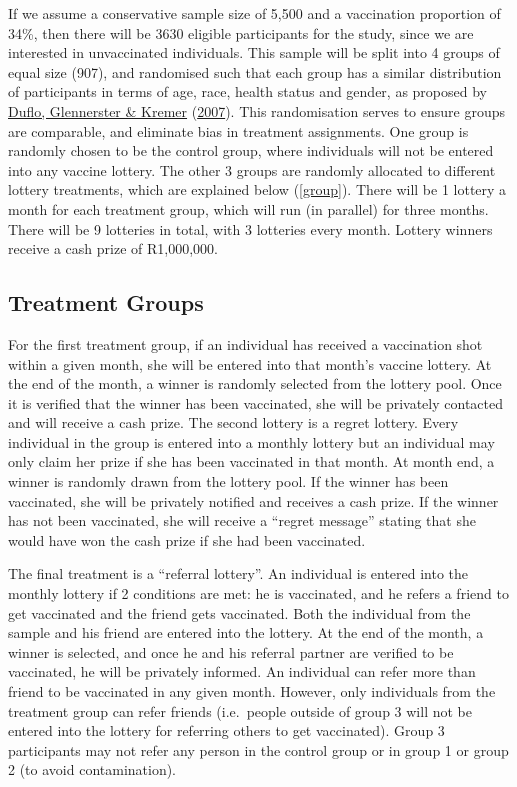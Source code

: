 \documentclass[11pt,preprint, authoryear]{elsarticle}
\numberwithin{equation}{section}
\numberwithin{figure}{section}
\numberwithin{table}{section}
\begin{document}
If we assume a conservative sample size of 5,500 and a vaccination
proportion of 34\%, then there will be 3630 eligible participants for
the study, since we are interested in unvaccinated individuals. This
sample will be split into 4 groups of equal size (907), and randomised
such that each group has a similar distribution of participants in terms
of age, race, health status and gender, as proposed by
\protect\hyperlink{ref-random}{Duflo, Glennerster \& Kremer}
(\protect\hyperlink{ref-random}{2007}). This randomisation serves to
ensure groups are comparable, and eliminate bias in treatment
assignments. One group is randomly chosen to be the control group, where
individuals will not be entered into any vaccine lottery. The other 3
groups are randomly allocated to different lottery treatments, which are
explained below (\ref{group}). There will be 1 lottery a month for each
treatment group, which will run (in parallel) for three months. There
will be 9 lotteries in total, with 3 lotteries every month. Lottery
winners receive a cash prize of R1,000,000.

\hypertarget{treatment-groups}{%
\subsection{\texorpdfstring{Treatment Groups
\label{group}}{Treatment Groups }}\label{treatment-groups}}

For the first treatment group, if an individual has received a
vaccination shot within a given month, she will be entered into that
month's vaccine lottery. At the end of the month, a winner is randomly
selected from the lottery pool. Once it is verified that the winner has
been vaccinated, she will be privately contacted and will receive a cash
prize. The second lottery is a regret lottery. Every individual in the
group is entered into a monthly lottery but an individual may only claim
her prize if she has been vaccinated in that month. At month end, a
winner is randomly drawn from the lottery pool. If the winner has been
vaccinated, she will be privately notified and receives a cash prize. If
the winner has not been vaccinated, she will receive a ``regret
message'' stating that she would have won the cash prize if she had been
vaccinated.

The final treatment is a ``referral lottery''. An individual is entered
into the monthly lottery if 2 conditions are met: he is vaccinated, and
he refers a friend to get vaccinated and the friend gets vaccinated.
Both the individual from the sample and his friend are entered into the
lottery. At the end of the month, a winner is selected, and once he and
his referral partner are verified to be vaccinated, he will be privately
informed. An individual can refer more than friend to be vaccinated in
any given month. However, only individuals from the treatment group can
refer friends (i.e.~people outside of group 3 will not be entered into
the lottery for referring others to get vaccinated). Group 3
participants may not refer any person in the control group or in group 1
or group 2 (to avoid contamination).
\end{document}
